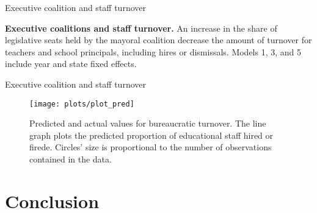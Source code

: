 \documentclass[ignorenonframetext,]{beamer}
\begin{document}
\begin{frame}{Executive coalition and staff turnover}
\protect\hypertarget{executive-coalition-and-staff-turnover}{}

\begin{table}[t]
  \centering
  \resizebox*{!}{\height}{%
  }
  \caption{{\bf Executive coalitions and staff turnover.} An increase in the share of legislative seats held by the mayoral coalition decrease the amount of turnover for teachers and school principals, including hires or dismissals. Models 1, 3, and 5 include year and state fixed effects.}
  \label{tbl:turnover}
\end{table}

\end{frame}

\begin{frame}{Executive coalition and staff turnover}
\protect\hypertarget{executive-coalition-and-staff-turnover-1}{}

\begin{figure}

{\centering \texttt{[image: plots/plot\_pred]} 

}

\caption{Predicted and actual values for bureaucratic turnover. The line graph plots the predicted proportion of educational staff hired or firede. Circles' size is proportional to the number of observations contained in the data.}\label{fig:unnamed-chunk-6}
\end{figure}

\end{frame}

\hypertarget{conclusion}{%
\section{Conclusion}\label{conclusion}}
\end{document}
